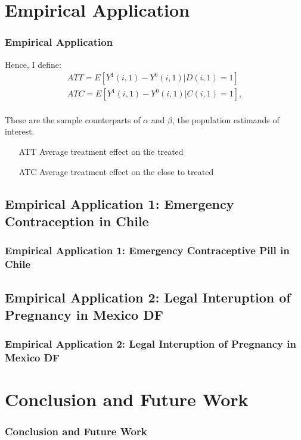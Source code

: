 \documentclass[10pt,letterpaper,subeqn]{beamer}
\begin{document}
\section{Empirical Application}
\begin{frame}[label=empir]
  \frametitle{Empirical Application}
Hence, I define:
\vspace{4mm}
\begin{eqnarray}
\label{Seqn:estimATT}
ATT=E[Y^1(i,1)-Y^0(i,1)|D(i,1)=1]\  \\
\label{Seqn:estimATC}
ATC=E[Y^1(i,1)-Y^0(i,1)|C(i,1)=1],
\end{eqnarray}
\vspace{4mm} \\
These are the sample counterparts of $\alpha$ and $\beta$, the population 
estimands of interest.
\vspace{8mm} \\
\begin{enumerate}
\item[ATT] Average treatment effect on the treated
\item[ATC] Average treatment effect on the close to treated
\end{enumerate}
\end{frame}


\subsection{Empirical Application 1: Emergency Contraception in Chile}
\begin{frame}[label=empirA]
  \frametitle{Empirical Application 1: Emergency Contraceptive Pill in Chile} 

\end{frame}


\subsection{Empirical Application 2: Legal Interuption of Pregnancy in Mexico DF}
\begin{frame}[label=empirB]
  \frametitle{Empirical Application 2: Legal Interuption of Pregnancy in Mexico DF}

\end{frame}



\section{Conclusion and Future Work}
\begin{frame}[label=concl]
  \frametitle{Conclusion and Future Work}

\end{frame}
\end{document}
